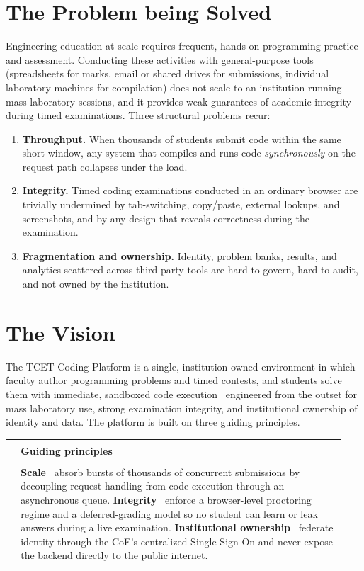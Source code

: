 \documentclass[12pt,a4paper,oneside]{report}
\makeatletter
\newenvironment{callout}[1]{%
  \par\vspace{4pt}\noindent
  \begin{tabular}{@{}p{0.014\linewidth}@{\hspace{0.6em}}p{0.93\linewidth}@{}}
  \textcolor{boxframe}{\rule{2pt}{\baselineskip}} &
  \textbf{\textcolor{tcetblue}{#1}}\\[2pt]
  & }{\end{tabular}\par\vspace{6pt}}
\makeatother
\begin{document}
\section{The Problem being Solved}
Engineering education at scale requires frequent, hands-on programming practice
and assessment. Conducting these activities with general-purpose tools
(spreadsheets for marks, email or shared drives for submissions, individual
laboratory machines for compilation) does not scale to an institution running
mass laboratory sessions, and it provides weak guarantees of academic integrity
during timed examinations. Three structural problems recur:

\begin{enumerate}[leftmargin=1.6em]
  \item \textbf{Throughput.} When thousands of students submit code within the
        same short window, any system that compiles and runs code
        \emph{synchronously} on the request path collapses under the load.
  \item \textbf{Integrity.} Timed coding examinations conducted in an ordinary
        browser are trivially undermined by tab-switching, copy/paste, external
        lookups, and screenshots, and by any design that reveals correctness
        during the examination.
  \item \textbf{Fragmentation and ownership.} Identity, problem banks, results,
        and analytics scattered across third-party tools are hard to govern,
        hard to audit, and not owned by the institution.
\end{enumerate}

\section{The Vision}
The TCET Coding Platform is a single, institution-owned environment in which faculty author
programming problems and timed contests, and students solve them with immediate,
sandboxed code execution \textemdash\ engineered from the outset for mass
laboratory use, strong examination integrity, and institutional ownership of
identity and data. The platform is built on three guiding principles.

\begin{callout}{Guiding principles}
\textbf{Scale} \textemdash\ absorb bursts of thousands of concurrent submissions
by decoupling request handling from code execution through an asynchronous
queue. \quad \textbf{Integrity} \textemdash\ enforce a browser-level proctoring
regime and a deferred-grading model so no student can learn or leak answers
during a live examination. \quad \textbf{Institutional ownership} \textemdash\
federate identity through the CoE's centralized Single Sign-On and never expose
the backend directly to the public internet.
\end{callout}
\end{document}
